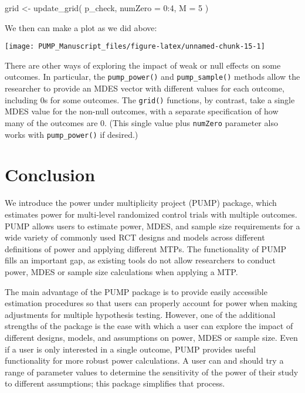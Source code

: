 \documentclass[
]{article}
\newenvironment{Shaded}{\begin{snugshade}}{\end{snugshade}}
\newcommand{\AttributeTok}[1]{\textcolor[rgb]{0.77,0.63,0.00}{#1}}
\newcommand{\DecValTok}[1]{\textcolor[rgb]{0.00,0.00,0.81}{#1}}
\newcommand{\FunctionTok}[1]{\textcolor[rgb]{0.00,0.00,0.00}{#1}}
\newcommand{\NormalTok}[1]{#1}
\newcommand{\OtherTok}[1]{\textcolor[rgb]{0.56,0.35,0.01}{#1}}
\newcommand{\SpecialCharTok}[1]{\textcolor[rgb]{0.00,0.00,0.00}{#1}}
\begin{document}
\begin{Shaded}
\begin{Highlighting}[]
\NormalTok{grid }\OtherTok{\textless{}{-}} \FunctionTok{update\_grid}\NormalTok{( p\_check,}
            \AttributeTok{numZero =} \DecValTok{0}\SpecialCharTok{:}\DecValTok{4}\NormalTok{,}
            \AttributeTok{M =} \DecValTok{5}\NormalTok{ )}
\end{Highlighting}
\end{Shaded}

We then can make a plot as we did above:

\begin{center}\texttt{[image: PUMP\_Manuscript\_files/figure-latex/unnamed-chunk-15-1]} \end{center}

There are other ways of exploring the impact of weak or null effects on
some outcomes. In particular, the \texttt{pump\_power()} and
\texttt{pump\_sample()} methods allow the researcher to provide an MDES
vector with different values for each outcome, including 0s for some
outcomes. The \texttt{grid()} functions, by contrast, take a single MDES
value for the non-null outcomes, with a separate specification of how
many of the outcomes are 0. (This single value plus \texttt{numZero}
parameter also works with \texttt{pump\_power()} if desired.)

\section{Conclusion}

We introduce the power under multiplicity project (PUMP) package, which
estimates power for multi-level randomized control trials with multiple
outcomes. PUMP allows users to estimate power, MDES, and sample size
requirements for a wide variety of commonly used RCT designs and models
across different definitions of power and applying different MTPs. The
functionality of PUMP fills an important gap, as existing tools do not
allow researchers to conduct power, MDES or sample size calculations
when applying a MTP.

The main advantage of the PUMP package is to provide easily accessible
estimation procedures so that users can properly account for power when
making adjustments for multiple hypothesis testing. However, one of the
additional strengths of the package is the ease with which a user can
explore the impact of different designs, models, and assumptions on
power, MDES or sample size. Even if a user is only interested in a
single outcome, PUMP provides useful functionality for more robust power
calculations. A user can and should try a range of parameter values to
determine the sensitivity of the power of their study to different
assumptions; this package simplifies that process.
\end{document}
